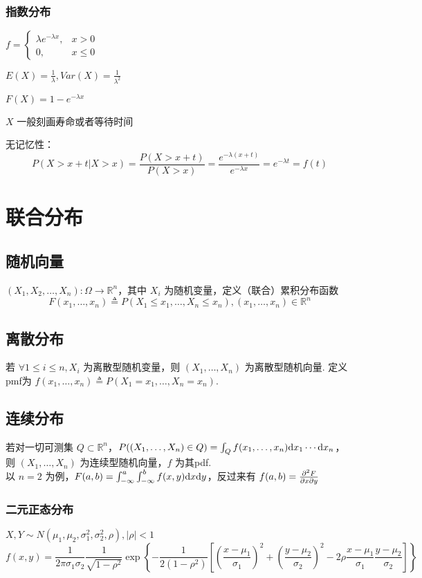 \documentclass[./main.tex]{subfiles}
\begin{document}
\subsubsection{指数分布}
\begin{itemize*}
    \item $f=\begin{cases}\lambda e^{-\lambda x},&x>0\\0,&x\le 0\end{cases}$
    \item $E(X)=\frac{1}{\lambda},Var(X)=\frac{1}{\lambda^2}$
    \item $F(X)=1-e^{-\lambda x}$
    \item $X$ 一般刻画寿命或者等待时间
    \item 无记忆性：$$P(X>x+t|X>x)=\frac{P(X>x+t)}{P(X>x)}=\frac{e^{-\lambda(x+t)}}{e^{-\lambda x}}=e^{-\lambda t}=f(t)$$
\end{itemize*}
\section{联合分布}
\subsection{随机向量}
$(X_1,X_2,\dots,X_n):\Omega\rightarrow\mathbb{R}^n$，其中 $X_i$ 为随机变量，定义（联合）累积分布函数
$$F(x_1,\dots,x_n)\triangleq P(X_1\le x_1,\dots,X_n\le x_n),(x_1,\dots,x_n)\in\mathbb{R}^n$$
\subsection{离散分布}
若 $\forall 1\le i\le n,X_i$ 为离散型随机变量，则 $(X_1,\dots,X_n)$ 为离散型随机向量. 定义pmf为 $f(x_1,\dots,x_n)\triangleq P(X_1=x_1,\dots,X_n=x_n)$. 
\subsection{连续分布}
若对一切可测集 $Q\subset\mathbb{R}^n$，$P((X_1,\dots,X_n)\in Q)=\int_Qf(x_1,\dots,x_n)\text{d}x_1\cdots\text{d}x_n$，则 $(X_1,\dots,X_n)$ 为连续型随机向量，$f$ 为其pdf. \\
\indent 以 $n=2$ 为例，$F(a,b)=\int_{-\infty}^a\int_{-\infty}^bf(x,y)\text{d}x\text{d}y$，反过来有 $f(a,b)=\frac{\partial^2F}{\partial x\partial y}$
\subsubsection{二元正态分布}
$X,Y\sim N(\mu_1,\mu_2,\sigma_1^2,\sigma_2^2,\rho),|\rho|<1$
\begin{equation}
    f(x,y)=\frac{1}{2\pi\sigma_1\sigma_2}\frac{1}{\sqrt{1-\rho^2}}\exp\left\{-\frac{1}{2(1-\rho^2)}\left[\left(\frac{x-\mu_1}{\sigma_1}\right)^2+\left(\frac{y-\mu_2}{\sigma_2}\right)^2-2\rho\frac{x-\mu_1}{\sigma_1}\frac{y-\mu_2}{\sigma_2}\right]\right\}
\end{equation}
\end{document}
